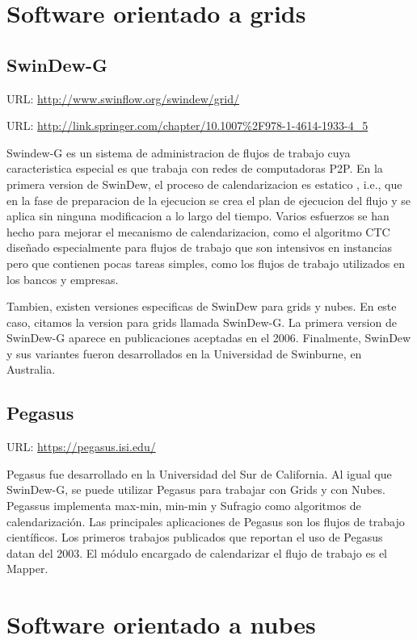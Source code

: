 \section{Software orientado a grids}

\subsection{SwinDew-G}
URL: \url{http://www.swinflow.org/swindew/grid/}

URL: \url{http://link.springer.com/chapter/10.1007%2F978-1-4614-1933-4_5}

Swindew-G es un sistema de administracion de flujos de trabajo cuya caracteristica especial es que trabaja con redes de computadoras P2P. En la primera version de SwinDew, el proceso de calendarizacion es estatico \cite{yang2007peer}, i.e., que en la fase de preparacion de la ejecucion se crea el plan de ejecucion del flujo y se aplica sin ninguna modificacion a lo largo del tiempo. Varios esfuerzos se han hecho para mejorar el mecanismo de calendarizacion, como el algoritmo CTC \cite{liu2010compromised} diseñado especialmente para flujos de trabajo que son intensivos en instancias pero que contienen pocas tareas simples, como los flujos de trabajo utilizados en los bancos y empresas.

Tambien, existen versiones especificas de SwinDew para grids y nubes. En este caso, citamos la version para grids llamada SwinDew-G. La primera version de SwinDew-G aparece en publicaciones aceptadas en el 2006. Finalmente, SwinDew y sus variantes fueron desarrollados en la Universidad de Swinburne, en Australia.

\subsection{Pegasus}
URL: \url{https://pegasus.isi.edu/}

Pegasus fue desarrollado en la Universidad del Sur de California. Al igual que SwinDew-G, se puede utilizar Pegasus para trabajar con Grids y con Nubes. Pegassus implementa max-min, min-min y Sufragio como algoritmos de calendarización. Las principales aplicaciones de Pegasus son los flujos de trabajo científicos. Los primeros trabajos publicados que reportan el uso de Pegasus datan del 2003. El módulo encargado de calendarizar el flujo de trabajo es el Mapper.

\section{Software orientado a nubes}

